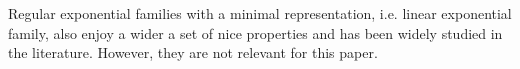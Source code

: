 \documentclass[11pt, oneside]{article}   	%
\numberwithin{figure}{section}
\numberwithin{equation}{section}
\numberwithin{table}{section}
\theoremstyle{definition}
\begin{document}
Regular exponential families with a minimal representation, i.e. linear exponential family, also enjoy a wider a set of nice properties and has been widely studied in the literature. However, they are not relevant for this paper. 






\end{document}
